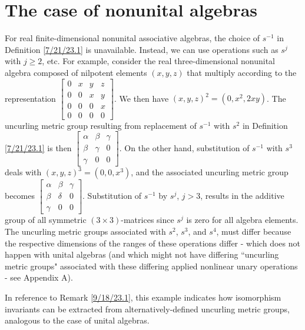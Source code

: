 \documentclass{amsart}
\numberwithin{equation}{section}
\theoremstyle{definition}
\numberwithin{theorem}{section}
\begin{document}
 
 \section{The case of nonunital algebras}

For real finite-dimensional nonunital associative algebras, the choice of $s^{-1}$ in Definition \ref{7/21/23.1} is unavailable.  Instead, we can use operations such as $s^j$ with $j\ge 2$, etc.   For example, consider the real three-dimensional nonunital algebra composed of nilpotent elements $(x,y,z)$ that multiply according to the representation
  $ \left[
\begin{array}{ccccc}
0 & x & y & z  \\
0 & 0 & x & y \\
0 & 0 & 0 & x \\
0 & 0 & 0 & 0
\end{array}
\right] $.  We then have $(x,y,z)^2 = (0,x^2, 2xy)$.  The uncurling metric group resulting from replacement of $s^{-1}$ with  $s^2$ in Definition \ref{7/21/23.1} is then $\left[
\begin{array}{ccccc}
\alpha & \beta & \gamma   \\
\beta & \gamma & 0 \\
\gamma & 0 & 0  
\end{array}
\right] $.  On the other hand, substitution of $s^{-1}$ with $s^3$  deals with $(x,y,z)^3 = (0,0, x^3)$, and the associated uncurling metric group becomes $\left[
\begin{array}{ccccc}
\alpha & \beta & \gamma   \\
\beta & \delta & 0 \\
\gamma & 0 & 0  
\end{array}
\right] $.  Substitution of $s^{-1}$ by $s^j$, $j>3$, results in the additive group of all symmetric $(3\times 3)$-matrices since $s^j$ is zero for all algebra elements.  The uncurling metric groups associated with $s^2$, $s^3$, and $s^4$, must differ because the respective dimensions of the ranges of these operations differ - which does not happen with unital algebras (and which might not have differing ``uncurling metric groups" associated with these differing applied nonlinear unary operations - see Appendix A).

In reference to Remark \ref{9/18/23.1}, this example indicates how isomorphism invariants can be extracted from alternatively-defined uncurling metric groups, analogous to the case of unital algebras. 

\bigskip
\end{document}
